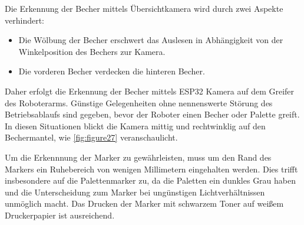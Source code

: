     Die Erkennung der Becher mittels Übersichtkamera wird durch zwei Aspekte verhindert:
    \begin{itemize}
        \item Die Wölbung der Becher erschwert das Auslesen in Abhängigkeit von der Winkelposition des Bechers zur Kamera.
        \item Die vorderen Becher verdecken die hinteren Becher.
    \end{itemize}

    Daher erfolgt die Erkennung der Becher mittels ESP32 Kamera auf dem Greifer des Roboterarms.
    Günstige Gelegenheiten ohne nennenswerte Störung des Betriebsablaufs sind gegeben, bevor der Roboter einen Becher oder Palette greift.
    In diesen Situationen blickt die Kamera mittig und rechtwinklig auf den Bechermantel, wie \ref{fig:figure27} veranschaulicht.

    Um die Erkennnung der Marker zu gewährleisten, muss um den Rand des Markers ein \glqq Ruhebereich \grqq von wenigen Millimetern eingehalten werden.
    Dies trifft insbesondere auf die Palettenmarker zu, da die Paletten ein dunkles Grau haben und die Unterscheidung zum Marker bei ungünstigen Lichtverhältnissen unmöglich macht.
    Das Drucken der Marker mit schwarzem Toner auf weißem Druckerpapier ist ausreichend.
